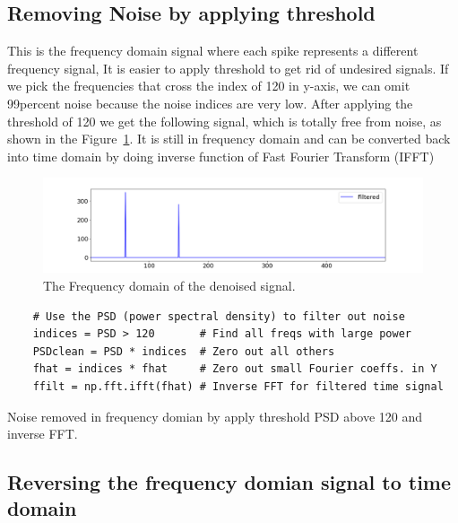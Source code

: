 \documentclass[a4paper, 12pt]{scrartcl}
\begin{document}
  \subsection{Removing Noise by applying threshold}

  This is the frequency domain signal where each spike represents a different frequency signal, 
  It is easier to apply threshold to get rid of undesired signals.  
  If we pick the frequencies that cross the index of 120 in y-axis, 
  we can omit 99percent noise because the noise indices are very low. 
  After applying the threshold of 120 we get the following signal, 
  which is totally free from noise, as shown in the Figure~\ref{fig:denoise_freq}. 
  It is still in frequency domain and can be converted back into time domain by doing inverse function of Fast Fourier Transform (IFFT)
  \begin{figure}[H] 
    \centering
    \includegraphics[width=\textwidth]{img/denoise_freq.png}
    \caption{The Frequency domain of the denoised signal.}
    \label{fig:denoise_freq}
  \end{figure}
  
  \begin{listing}[H]
    \begin{verbatim}
    # Use the PSD (power spectral density) to filter out noise
    indices = PSD > 120       # Find all freqs with large power
    PSDclean = PSD * indices  # Zero out all others
    fhat = indices * fhat     # Zero out small Fourier coeffs. in Y
    ffilt = np.fft.ifft(fhat) # Inverse FFT for filtered time signal
    \end{verbatim}
    \caption{Noise removed in frequency domian by apply threshold PSD above 120 and inverse FFT.}
    \label{listing:denoise_freq}
    \end{listing}
  \subsection{Reversing the frequency domian signal to time domain}
\end{document}
